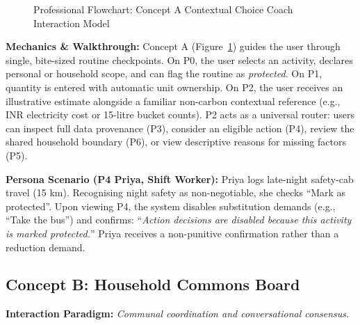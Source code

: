 \documentclass[12pt,a4paper]{article}
\begin{document}
\begin{figure}[ht]
{%
}
\endgroup
\caption{Professional Flowchart: Concept A Contextual Choice Coach Interaction Model}
\label{fig:concept_a_flow}
\end{figure}

\textbf{Mechanics \& Walkthrough:} Concept A (Figure~\ref{fig:concept_a_flow}) guides the user through single, bite-sized routine checkpoints. On P0, the user selects an activity, declares personal or household scope, and can flag the routine as \emph{protected}. On P1, quantity is entered with automatic unit ownership. On P2, the user receives an illustrative estimate alongside a familiar non-carbon contextual reference (e.g., INR electricity cost or 15-litre bucket counts). P2 acts as a universal router: users can inspect full data provenance (P3), consider an eligible action (P4), review the shared household boundary (P6), or view descriptive reasons for missing factors (P5).

\textbf{Persona Scenario (P4 Priya, Shift Worker):} Priya logs late-night safety-cab travel (15 km). Recognising night safety as non-negotiable, she checks ``Mark as protected''. Upon viewing P4, the system disables substitution demands (e.g., ``Take the bus'') and confirms: ``\emph{Action decisions are disabled because this activity is marked protected.}'' Priya receives a non-punitive confirmation rather than a reduction demand.

\subsection{Concept B: Household Commons Board}
\textbf{Interaction Paradigm:} \emph{Communal coordination and conversational consensus.}
\end{document}
